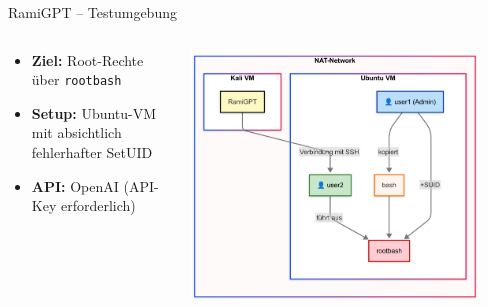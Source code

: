 \documentclass[
	aspectratio=169,	%
	onlytextwidth,		%
	t,					%
	]{beamer}
\begin{document}
\begin{frame}{RamiGPT – Testumgebung}
	\begin{columns}
		\begin{column}[T]{.45\textwidth}
			\begin{itemize}
				\item \textbf{Ziel:} Root-Rechte über \texttt{rootbash}
				
				\item \textbf{Setup:} Ubuntu-VM mit absichtlich fehlerhafter SetUID
				
				\item \textbf{API:} OpenAI (API-Key erforderlich)
			\end{itemize}
			
		\end{column}
		\begin{column}[T]{.55\textwidth}
			\centering
			\vspace{-4mm}
			\includegraphics[width=0.9\textwidth]{figures/14.png}
			\label{fig:14}
		\end{column}
	\end{columns}
\end{frame}
\end{document}
